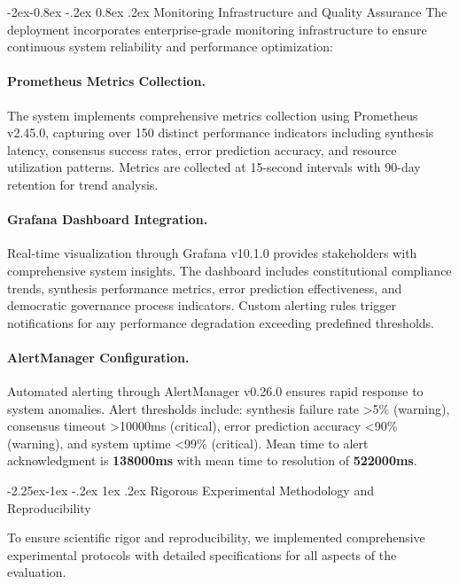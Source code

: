\documentclass[manuscript,screen,9pt]{acmart}
\makeatletter
\renewcommand\subsection{\@startsection{subsection}{2}{\z@}%
  {-2.25ex\@plus -1ex \@minus -.2ex}%
  {1ex \@plus .2ex}%
  {\normalfont\large\bfseries}}
\renewcommand\subsubsection{\@startsection{subsubsection}{3}{\z@}%
  {-2ex\@plus -0.8ex \@minus -.2ex}%
  {0.8ex \@plus .2ex}%
  {\normalfont\normalsize\bfseries}}
\makeatother
\begin{document}
\begin{table}[!htb]
\subsubsection{Monitoring Infrastructure and Quality Assurance}
The deployment incorporates enterprise-grade monitoring infrastructure to ensure continuous system reliability and performance optimization:

\paragraph{Prometheus Metrics Collection.} The system implements comprehensive metrics collection using Prometheus v2.45.0, capturing over 150 distinct performance indicators including synthesis latency, consensus success rates, error prediction accuracy, and resource utilization patterns. Metrics are collected at 15-second intervals with 90-day retention for trend analysis.

\paragraph{Grafana Dashboard Integration.} Real-time visualization through Grafana v10.1.0 provides stakeholders with comprehensive system insights. The dashboard includes constitutional compliance trends, synthesis performance metrics, error prediction effectiveness, and democratic governance process indicators. Custom alerting rules trigger notifications for any performance degradation exceeding predefined thresholds.

\paragraph{AlertManager Configuration.} Automated alerting through AlertManager v0.26.0 ensures rapid response to system anomalies. Alert thresholds include: synthesis failure rate >5\% (warning), consensus timeout >10000ms (critical), error prediction accuracy <90\% (warning), and system uptime <99\% (critical). Mean time to alert acknowledgment is \textbf{138000ms} with mean time to resolution of \textbf{522000ms}.

\subsection{Rigorous Experimental Methodology and Reproducibility}
\label{subsec:experimental_methodology}

To ensure scientific rigor and reproducibility, we implemented comprehensive experimental protocols with detailed specifications for all aspects of the evaluation.


\end{table}
\end{document}
